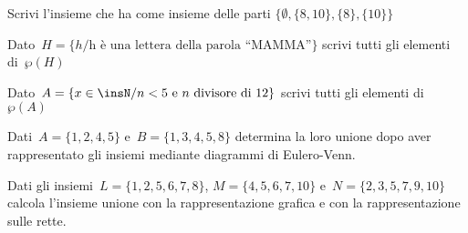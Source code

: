 \begin{esercizio}
 \label{ese:7.4}
 Scrivi l'insieme che ha come insieme delle parti
\(\{\emptyset,\{8,10\},\{8\},\{10\}\}\)
\end{esercizio}

\begin{esercizio}
 \label{ese:7.5}
Dato~\(H=\{h/\text{h è una lettera della parola ``MAMMA''}\}\) scrivi
tutti gli elementi di~\(\wp (H)\)
\end{esercizio}

\begin{esercizio}
 \label{ese:7.6}
 Dato~\(A=\{x\in\insN/ n<5\text{ e }n\text{ divisore di~12}\}\) scrivi tutti gli 
elementi di
\(\wp (A)\)
\end{esercizio}


\begin{esercizio}
 \label{ese:7.7}
Dati~\(A=\{1,2,4,5\}\) e~\(B=\{1,3,4,5,8\}\) determina la loro unione dopo
aver rappresentato gli insiemi mediante diagrammi di Eulero-Venn.
 \end{esercizio}

\begin{esercizio}
 \label{ese:7.8}
 Dati gli insiemi~\(L=\{1,2,5,6,7,8\}\), \(M=\{4,5,6,7,10\}\) e~\(N=\{2,3,5,7,9,10\}\)
calcola l'insieme unione con la rappresentazione grafica e con la 
rappresentazione sulle rette.
%  
\end{esercizio}

